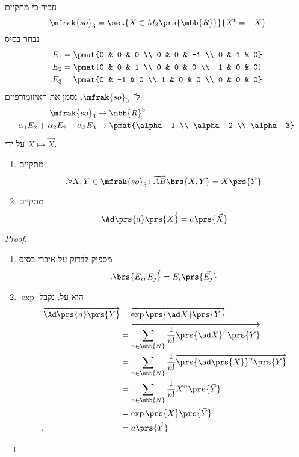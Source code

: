 \documentclass[10pt, twoside]{book}
\begin{document}
נזכיר כי מתקיים
\[\text{.} \mfrak{so}_3 = \set{X \in M_3\prs{\mbb{R}}}{X^t = -X}\]
נבחר בסיס
\begin{align*}
E_1 &= \pmat{0 & 0 & 0 \\ 0 & 0 & -1 \\ 0 & 1 & 0} \\
E_2 &= \pmat{0 & 0 & 1 \\ 0 & 0 & 0 \\ -1 & 0 & 0} \\
\text{.} E_3 &= \pmat{0 & -1 & 0 \\ 1 & 0 & 0 \\ 0 & 0 & 0}
\end{align*}
ל־%
$\mfrak{so}_3$.
נסמן את האיזומורפיזם
\begin{align*}
\mfrak{so}_3 &\to \mbb{R}^3 \\
\alpha_1 E_2 + \alpha_2 E_2 + \alpha_3 E_3 &\mapsto \pmat{\alpha_1 \\ \alpha_2 \\ \alpha_3}
\end{align*}
על ידי
$X \mapsto \vec{X}$.

\begin{lemma}
\begin{enumerate}
\item מתקיים
\[\text{.} \forall X,Y \in \mfrak{so}_3 \colon \overrightarrow{AB}{\brs{X,Y}} = X\prs{\vec{Y}}\]
\item
מתקיים
\[\text{.} \overrightarrow{\Ad\prs{a}\prs{X}} = a\prs{\vec{X}}\]
\end{enumerate}
\end{lemma}

\begin{proof}
\begin{enumerate}
\item
מספיק לבדוק על איברי בסיס
\[\text{.} \overrightarrow{\brs{E_i, E_j}} = E_i \prs{\vec{E_j}}\]
\item $\exp$
הוא על.
נקבל
\begin{align*}
\overrightarrow{\Ad\prs{a} \prs{Y}}
&=
\overrightarrow{\exp\prs{\ad X}\prs{Y}}
\\&=
\overrightarrow{\sum_{n \in \mbb{N}} \frac{1}{n!} \prs{\ad X}^n\prs{Y}}
\\&=
\sum_{n \in \mbb{N}} \frac{1}{n!} \overrightarrow{\prs{\ad\prs{X}}^n\prs{Y}}
\\&=
\sum_{n \in \mbb{N}} \frac{1}{n!} X^n\prs{\vec{Y}}
\\&=
\exp\prs{X} \prs{\vec{Y}}
\\\text{.} \hphantom{\overrightarrow{\Ad\prs{a} \prs{Y}}} &=
a\prs{\vec{Y}}
\end{align*}
\end{enumerate}
\end{proof}
\end{document}
